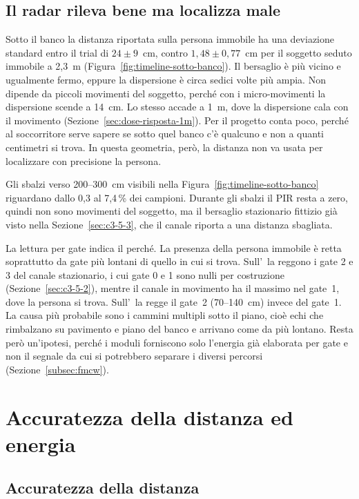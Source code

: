 \subsection{Il radar rileva bene ma localizza male}
\label{sec:sotto-banco-localizzazione}

Sotto il banco la distanza riportata sulla persona immobile ha una deviazione standard entro il trial di $24 \pm 9$~cm, contro $1{,}48 \pm 0{,}77$~cm per il soggetto seduto immobile a 2,3~m (Figura~\ref{fig:timeline-sotto-banco}). Il bersaglio è più vicino e ugualmente fermo, eppure la dispersione è circa sedici volte più ampia. Non dipende da piccoli movimenti del soggetto, perché con i micro-movimenti la dispersione scende a 14~cm. Lo stesso accade a 1~m, dove la dispersione cala con il movimento (Sezione~\ref{sec:dose-risposta-1m}). Per il progetto conta poco, perché al soccorritore serve sapere se sotto quel banco c'è qualcuno e non a quanti centimetri si trova. In questa geometria, però, la distanza non va usata per localizzare con precisione la persona.

Gli sbalzi verso 200--300~cm visibili nella Figura~\ref{fig:timeline-sotto-banco} riguardano dallo 0,3 al 7,4\,\% dei campioni. Durante gli sbalzi il PIR resta a zero, quindi non sono movimenti del soggetto, ma il bersaglio stazionario fittizio già visto nella Sezione~\ref{sec:c3-5-3}, che il canale riporta a una distanza sbagliata.

La lettura per gate indica il perché. La presenza della persona immobile è retta soprattutto da gate più lontani di quello in cui si trova. Sull'\ldb\ la reggono i gate 2 e 3 del canale stazionario, i cui gate 0 e 1 sono nulli per costruzione (Sezione~\ref{sec:c3-5-2}), mentre il canale in movimento ha il massimo nel gate~1, dove la persona si trova. Sull'\ldc\ la regge il gate~2 (70--140~cm) invece del gate~1. La causa più probabile sono i cammini multipli sotto il piano, cioè echi che rimbalzano su pavimento e piano del banco e arrivano come da più lontano. Resta però un'ipotesi, perché i moduli forniscono solo l'energia già elaborata per gate e non il segnale da cui si potrebbero separare i diversi percorsi (Sezione~\ref{subsec:fmcw}).

\section{Accuratezza della distanza ed energia}
\label{sec:distanza}

\subsection{Accuratezza della distanza}
\label{sec:distanza-accuratezza}

